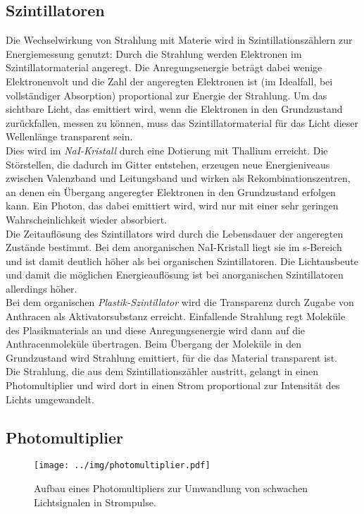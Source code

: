 \subsection{Szintillatoren}
Die Wechselwirkung von Strahlung mit Materie wird in Szintillationszählern zur Energiemessung genutzt:
Durch die Strahlung werden Elektronen im Szintillatormaterial angeregt.
Die Anregungsenergie beträgt dabei wenige Elektronenvolt und die Zahl der angeregten Elektronen
ist (im Idealfall, bei vollständiger Absorption) proportional zur Energie der Strahlung.
Um das sichtbare Licht, das emittiert wird, wenn die Elektronen in den Grundzustand zurückfallen,
messen zu können, muss das Szintillatormaterial für das Licht dieser Wellenlänge transparent sein.\\
Dies wird im \emph{NaI-Kristall} durch eine Dotierung mit Thallium erreicht.
Die Störstellen, die dadurch im Gitter entstehen,
erzeugen neue Energieniveaus zwischen Valenzband und Leitungsband und wirken als
Rekombinationszentren, an denen ein Übergang angeregter Elektronen in den Grundzustand erfolgen kann.
Ein Photon, das dabei emittiert wird, wird nur mit einer sehr geringen Wahrscheinlichkeit
wieder absorbiert.\\
Die Zeitauflösung des Szintillators wird durch die Lebensdauer der angeregten Zustände bestimmt.
Bei dem anorganischen NaI-Kristall liegt sie im \textmu s-Bereich und ist damit deutlich
höher als bei organischen Szintillatoren.
Die Lichtausbeute und damit die möglichen Energieauflösung ist bei anorganischen
Szintillatoren allerdings höher.\\
Bei dem organischen \emph{Plastik-Szintillator} wird die Transparenz durch Zugabe
von Anthracen als Aktivatorsubstanz erreicht.
Einfallende Strahlung regt Moleküle des Plasikmaterials an und diese Anregungsenergie wird
dann auf die Anthracenmoleküle
übertragen. Beim Übergang der Moleküle in den Grundzustand wird Strahlung emittiert,
für die das Material transparent ist.\\
Die Strahlung, die aus dem Szintillationszähler austritt,
gelangt in einen Photomultiplier und wird dort in einen Strom proportional zur Intensität
des Lichts umgewandelt.

\subsection{Photomultiplier}

\begin{figure}[H]
\begin{center}
  \texttt{[image: ../img/photomultiplier.pdf]}
  \caption[---]{Aufbau eines Photomultipliers zur Umwandlung von schwachen Lichtsignalen in Strompulse.}
  \label{img:photomultiplier}
\end{center}
\end{figure}

